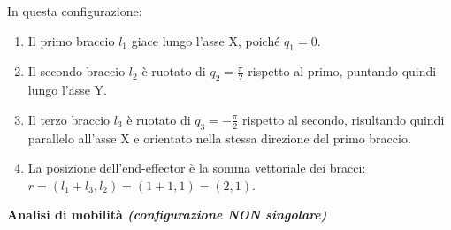 \documentclass[11pt, a4paper]{article}
\begin{document}

\begin{par}
\begin{flushleft}
In questa configurazione:
\begin{enumerate}
   \item \begin{flushleft} Il primo braccio $l_1$ giace lungo l'asse X, poiché $q_1=0$. \end{flushleft}
   \item \begin{flushleft} Il secondo braccio $l_2$ è ruotato di $q_2 = \frac{\pi}{2}$ rispetto al primo, puntando quindi lungo l'asse Y. \end{flushleft}
   \item \begin{flushleft} Il terzo braccio $l_3$ è ruotato di $q_3 = -\frac{\pi}{2}$ rispetto al secondo, risultando quindi parallelo all'asse X e orientato nella stessa direzione del primo braccio. \end{flushleft}
   \item \begin{flushleft} La posizione dell'end-effector è la somma vettoriale dei bracci: $r = (l_1 + l_3, l_2) = (1+1, 1) = (2,1)$. \end{flushleft}
\end{enumerate}

\end{flushleft}
\end{par}

\begin{par}
\begin{flushleft}
\textbf{Analisi di mobilità \textit{(configurazione NON singolare)}}
\end{flushleft}
\end{par}
\end{document}
